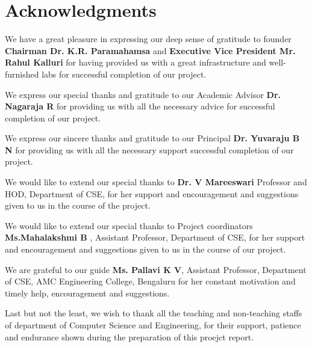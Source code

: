 \documentclass[a4paper, 12pt]{report}
\begin{document}
\setlength{\parindent}{0pt}


\chapter*{Acknowledgments}
\thispagestyle{borderedpage}
We have a great pleasure in expressing our deep sense of gratitude to founder \textbf{Chairman Dr. K.R. Paramahamsa} and \textbf{Executive Vice President Mr. Rahul Kalluri} for having provided us with a great infrastructure and well-furnished labs for successful completion of our project.

\vspace{0.2cm}

We express our special thanks and gratitude to our Academic Advisor \textbf{Dr. Nagaraja R} for providing us with all the necessary advice for successful completion of our project.

\vspace{0.2cm}

We express our sincere thanks and gratitude to our Principal \textbf{Dr. Yuvaraju B N} for providing us with all the necessary support successful completion of our project.

\vspace{0.2cm}

We would like to extend our special thanks to \textbf{Dr. V Mareeswari} Professor and HOD, Department of CSE, for her support and encouragement and suggestions given to us in the course of the project.

\vspace{0.2cm}

We would like to extend our special thanks to Project coordinators \textbf{Ms.Mahalakshmi B} , Assistant Professor, Department of CSE, for her support and encouragement and suggestions given to us in the course of our project.

\vspace{0.2cm}

We are grateful to our guide \textbf{Ms. Pallavi K V}, Assistant Professor, Department of CSE, AMC Engineering College, Bengaluru for her constant motivation and timely help, encouragement and suggestions.

\vspace{0.2cm}

Last but not the least, we wish to thank all the teaching and non-teaching staffs of department of Computer Science and Engineering, for their support, patience and endurance shown during the preparation of this proejct report.
\end{document}
